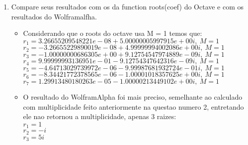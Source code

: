 \documentclass[fleqn]{article}
\begin{document}
\begin{enumerate}
\begin{itemize}
   \end{itemize}
   \newpage
      \item Compare seus resultados com os da function roots(coef) do Octave e com os resultados do Wolframalfha.
   \begin{itemize}
    \item Considerando que o roots do octave usa M = 1 temos que:\\
        $r_{1} = 3.26655209548221e-08 + 5.00000005997915e+00i,\ M = 1$\\
        $r_{2} = -3.26655229890019e-08 + 4.99999994002086e+00i,\ M =1$\\
        $r_{3} = -1.00000000686305e+00 + 9.12754547974889e-09i,\ M = 1$\\
        $r_{4} = 9.99999993136951e-01 - 9.12754347642316e-09i,\ M = 1$\\
        $r_{5} = -4.64713029739972e-06 - 9.99987681932724e-01i,\ M = 1$\\
        $r_{6} = -8.34421772378565e-06 - 1.00001018357625e+00i,\ M = 1$\\
        $r_{7} = 1.29913480180263e-05 - 1.00000213449102e+00i,\ M = 1$\\
        \item O resultado do WolframAlpha foi mais preciso, semelhante ao calculado com multiplicidade feito anteriormente na questao numero 2, entretando ele nao retornou a multiplicidade, apenas 3 raizes:\\
        $r_{1} = 1$\\
        $r_{2} = -i$\\
        $r_{3} = 5i$
   \end{itemize}
\end{enumerate}
\end{document}
